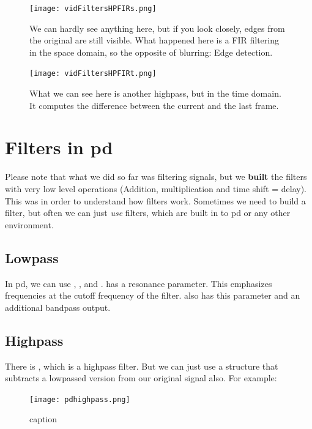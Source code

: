 {\begin{figure}[H]
	\begin{center}
		\texttt{[image: vidFiltersHPFIRs.png]}
		\caption[Video Filters: FIR Highpass, space domain]
		{We can hardly see anything here, but if you look closely, edges from the original are still visible. What happened here is a FIR filtering in the space domain, so the opposite of blurring: Edge detection.}
		\label{fig:name}
	\end{center}
\end{figure}



\begin{figure}[H]
	\begin{center}
		\texttt{[image: vidFiltersHPFIRt.png]}
		\caption[Video Filters: FIR Highpass, time domain]
		{What we can see here is another highpass, but in the time domain. It computes the difference between the current and the last frame.}
		\label{fig:name}
	\end{center}
\end{figure}





}

\section{Filters in pd}
Please note that what we did so far was filtering signals, but we \textbf{built} the filters with very low level operations (Addition, multiplication and time shift = delay). This was in order to understand how filters work. Sometimes we need to build a filter, but often we can just \textit{use} filters, which are built in to pd or any other environment.\\
\subsection{Lowpass}
In pd, we can use , ,  and .  has a resonance parameter. This emphasizes frequencies at the cutoff frequency of the filter.  also has this parameter and an additional bandpass output.

\subsection{Highpass}
There is , which is a highpass filter. But we can just use a structure that subtracts a lowpassed version from our original signal also. For example:
\begin{figure}[H]
	\begin{center}
		\texttt{[image: pdhighpass.png]}
		\caption{caption}
		\label{fig:name}
	\end{center}
\end{figure}


